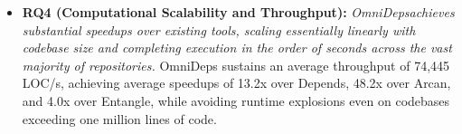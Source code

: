 \begin{itemize}[leftmargin=2.0em]
  \item \textbf{RQ4 (Computational Scalability and Throughput):}
    \textit{OmniDeps\linebreak achieves substantial speedups over existing
      tools, scaling essentially linearly with codebase size and
      completing execution in the order of seconds across the vast
    majority of repositories.}
    OmniDeps sustains an average throughput of 74,445 LOC/s,
    achieving average speedups of 13.2x over Depends, 48.2x over
    Arcan, and 4.0x over Entangle, while avoiding runtime
    explosions even on codebases exceeding one million lines of code.
\end{itemize}
